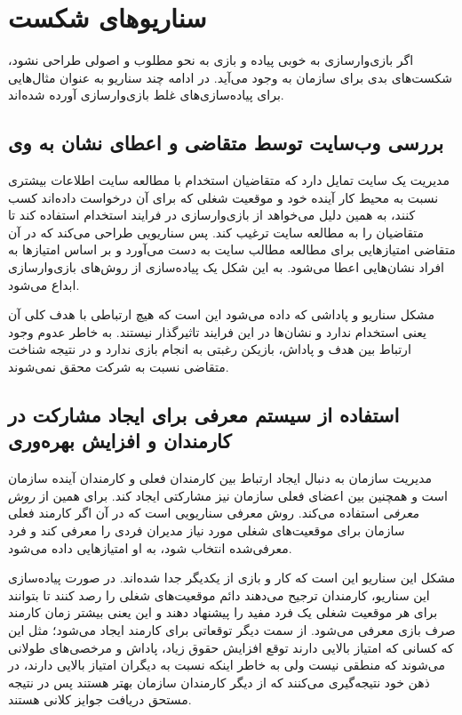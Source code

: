 \section{سناریوهای شکست}
اگر بازی‌وارسازی به خوبی پیاده و بازی به نحو مطلوب و اصولی طراحی نشود، شکست‌های بدی برای سازمان به وجود می‌آید. در ادامه چند سناریو به عنوان مثال‌هایی برای پیاده‌سازی‌های غلط بازی‌وارسازی آورده شده‌اند.
\subsection{بررسی وب‌سایت توسط متقاضی و اعطای نشان به وی}
مدیریت یک سایت تمایل دارد که متقاضیان استخدام با مطالعه سایت اطلاعات بیشتری نسبت به محیط کار آینده خود و موقعیت شغلی که برای آن درخواست داده‌اند کسب کنند، به همین دلیل می‌خواهد از بازی‌وارسازی در فرایند استخدام استفاده کند تا متقاضیان را به مطالعه سایت ترغیب کند. پس سناریویی طراحی می‌کند که در آن متقاضی امتیازهایی برای مطالعه مطالب سایت به دست می‌آورد و بر اساس امتیازها به افراد نشان‌هایی اعطا می‌شود. به این شکل یک پیاده‌سازی از روش‌های بازی‌وارسازی ابداع می‌شود.

مشکل سناریو و پاداشی که داده می‌شود این است که هیچ ارتباطی با هدف کلی آن یعنی استخدام ندارد و نشان‌ها در این فرایند تاثیرگذار نیستند. به خاطر عدوم وجود ارتباط بین هدف و پاداش، بازیکن رغبتی به انجام بازی ندارد و در نتیجه شناخت متقاضی نسبت به شرکت محقق نمی‌شوند.
\subsection{استفاده از سیستم معرفی برای ایجاد مشارکت در کارمندان و افزایش بهره‌وری}
مدیریت سازمان به دنبال ایجاد ارتباط بین کارمندان فعلی و کارمندان آینده سازمان است و همچنین بین اعضای فعلی سازمان نیز مشارکتی ایجاد کند. برای همین از \emph{روش معرفی }استفاده می‌کند. روش معرفی سناریویی است که در آن اگر کارمند فعلی سازمان برای موقعیت‌های شغلی مورد نیاز مدیران فردی را معرفی کند و فرد معرفی‌شده انتخاب شود، به او امتیازهایی داده می‌شود.

مشکل این سناریو این است که کار و بازی از یکدیگر جدا شده‌اند. در صورت پیاده‌سازی این سناریو، کارمندان ترجیح می‌دهند دائم موقعیت‌های شغلی را رصد کنند تا بتوانند برای هر موقعیت شغلی یک فرد مفید را پیشنهاد دهند و این یعنی بیشتر زمان کارمند صرف بازی معرفی می‌شود. از سمت دیگر توقعاتی برای کارمند ایجاد می‌شود؛ مثل این که کسانی که امتیاز بالایی دارند توقع افزایش حقوق زیاد، پاداش و مرخصی‌های طولانی می‌شوند که منطقی نیست ولی به خاطر اینکه نسبت به دیگران امتیاز بالایی دارند، در ذهن خود نتیجه‌گیری می‌کنند که از دیگر کارمندان سازمان بهتر هستند پس در نتیجه مستحق دریافت جوایز کلانی هستند.